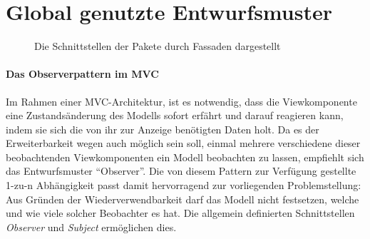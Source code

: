\documentclass[parskip=full]{scrartcl}
\begin{document}
\section{Global genutzte Entwurfsmuster}
\label{GlobalePatterns}
\begin{figure}[!h]
\caption{Die Schnittstellen der Pakete durch Fassaden dargestellt}
\label{fig:fassaden}
\end{figure}
\newpage
\paragraph{Das Observerpattern im MVC}
Im Rahmen einer MVC-Architektur, ist es notwendig, dass die Viewkomponente eine Zustandsänderung des Modells sofort erfährt und darauf reagieren kann, indem sie sich die von ihr zur Anzeige benötigten Daten holt. Da es der Erweiterbarkeit wegen auch möglich sein soll, einmal mehrere verschiedene dieser beobachtenden Viewkomponenten ein Modell beobachten zu lassen, empfiehlt sich das Entwurfsmuster \enquote{Observer}. Die von diesem Pattern zur Verfügung gestellte 1-zu-n Abhängigkeit passt damit hervorragend zur vorliegenden Problemstellung: Aus Gründen der Wiederverwendbarkeit darf das Modell nicht festsetzen, welche und wie viele solcher Beobachter es hat. Die allgemein definierten Schnittstellen \textit{Observer} und \textit{Subject} ermöglichen dies. 
\end{document}
